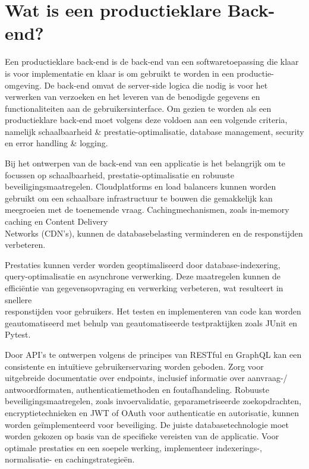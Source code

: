 \newpage
\section{Wat is een productieklare Back-end?}

Een productieklare back-end is de back-end van een softwaretoepassing die klaar is voor implementatie en klaar is om gebruikt te worden in een productie-\\omgeving. De back-end omvat de server-side logica die nodig is voor het \\verwerken van verzoeken en het leveren van de benodigde gegevens en \\functionaliteiten aan de gebruikersinterface. Om gezien te worden als een \\productieklare back-end moet volgens \textcite{Senthilkumar2023} deze voldoen aan een volgende criteria, namelijk schaalbaarheid & prestatie-optimalisatie, database management, security en error handling & logging. 

Bij het ontwerpen van de back-end van een applicatie is het belangrijk om te \\focussen op schaalbaarheid, prestatie-optimalisatie en robuuste beveiligingsmaatregelen. Cloudplatforms en load balancers kunnen worden gebruikt om een schaalbare infrastructuur te bouwen die gemakkelijk kan meegroeien met de toenemende vraag. Cachingmechanismen, zoals in-memory caching en Content Delivery \\Networks (CDN's), kunnen de databasebelasting verminderen en de responstijden verbeteren.

Prestaties kunnen verder worden geoptimaliseerd door database-indexering, query-optimalisatie en asynchrone verwerking. Deze maatregelen kunnen de efficiëntie van gegevensopvraging en verwerking verbeteren, wat resulteert in snellere \\responstijden voor gebruikers. Het testen en implementeren van code kan worden geautomatiseerd met behulp van geautomatiseerde testpraktijken zoals JUnit en Pytest.

Door API's te ontwerpen volgens de principes van RESTful en GraphQL kan een \\consistente en intuïtieve gebruikerservaring worden geboden. Zorg voor \\uitgebreide documentatie over endpoints, inclusief informatie over aanvraag-/ \\antwoordformaten, authenticatiemethoden en foutafhandeling. Robuuste \\beveiligingsmaatregelen, zoals invoervalidatie, geparametriseerde zoekopdrachten, encryptietechnieken en JWT of OAuth voor authenticatie en autorisatie, kunnen worden geïmplementeerd voor beveiliging. De juiste databasetechnologie moet worden gekozen op basis van de specifieke vereisten van de applicatie. Voor \\optimale prestaties en een soepele werking, implementeer indexerings-, normalisatie- en cachingstrategieën.

